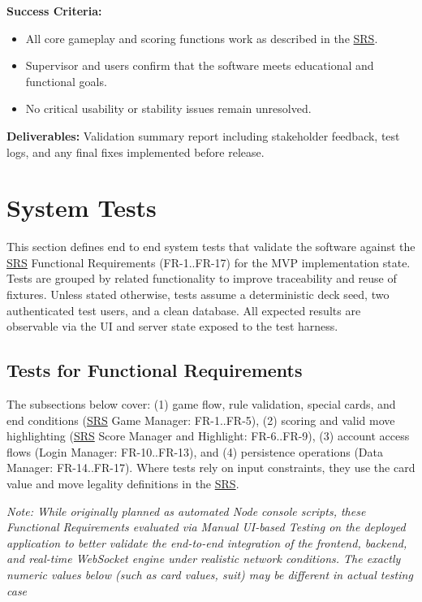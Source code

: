 \documentclass[12pt, titlepage]{article}
\begin{document}
\noindent\textbf{Success Criteria:}
\begin{itemize}
    \item All core gameplay and scoring functions work as described in the \href{../SRS/SRS.pdf}{SRS}.  
    \item Supervisor and users confirm that the software meets educational and functional goals.  
    \item No critical usability or stability issues remain unresolved.
\end{itemize}

\noindent\textbf{Deliverables:}  
Validation summary report including stakeholder feedback, test logs, and any final fixes implemented before release.


\section{System Tests}

This section defines end to end system tests that validate the software against the \href{../SRS/SRS.pdf}{SRS} Functional Requirements (FR-1..FR-17) for the MVP implementation state. Tests are grouped by related functionality to improve traceability and reuse of fixtures. Unless stated otherwise, tests assume a deterministic deck seed, two authenticated test users, and a clean database. All expected results are observable via the UI and server state exposed to the test harness.

\subsection{Tests for Functional Requirements}

The subsections below cover: (1) game flow, rule validation, special cards, and end conditions (\href{../SRS/SRS.pdf}{SRS} Game Manager: FR-1..FR-5), (2) scoring and valid move highlighting (\href{../SRS/SRS.pdf}{SRS} Score Manager and Highlight: FR-6..FR-9), (3) account access flows (Login Manager: FR-10..FR-13), and (4) persistence operations (Data Manager: FR-14..FR-17). Where tests rely on input constraints, they use the card value and move legality definitions in the \href{../SRS/SRS.pdf}{SRS}.

\textit{Note: While originally planned as automated Node console scripts, these Functional Requirements evaluated via Manual UI-based Testing on the deployed application to better validate the end-to-end integration of the frontend, backend, and real-time WebSocket engine under realistic network conditions. The exactly numeric values below (such as card values, suit) may be different in actual testing case}
\end{document}
